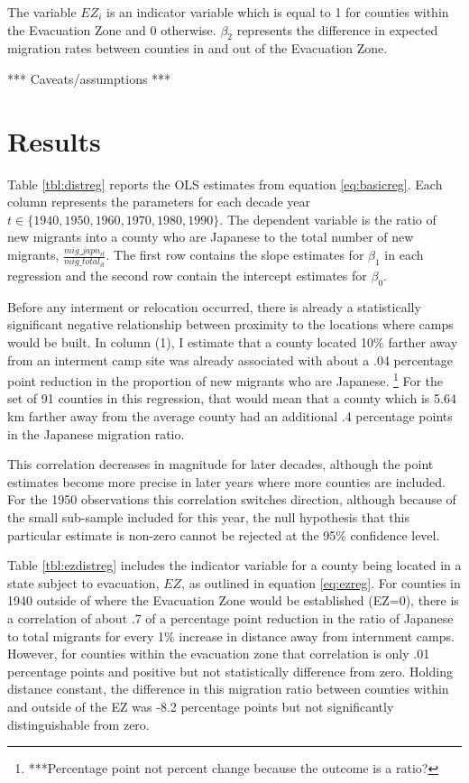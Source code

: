 \documentclass[12pt]{article}
\begin{document}
The variable $EZ_i$ is an indicator variable which is equal to 1 for counties within the Evacuation Zone and 0 otherwise.
$\beta_2$ represents the difference in expected migration rates between counties in and out of the Evacuation Zone.

*** Caveats/assumptions ***

\section{Results}\label{results}



Table \ref{tbl:distreg} reports the OLS estimates from equation \ref{eq:basicreg}.
Each column represents the parameters for each decade year $t \in \{1940, 1950, 1960, 1970, 1980, 1990\}$.
The dependent variable is the ratio of new migrants into a county who are Japanese to the total number of new migrants, $\frac{mig\_japn_{it}}{mig\_total_{it}}$.
The first row contains the slope estimates for $\beta_1$ in each regression
and the second row contain the intercept estimates for $\beta_0$.

Before any interment or relocation occurred, there is already a statistically significant negative relationship between proximity to the locations where camps would be built.
In column (1), I estimate that a county located 10\% farther away from an interment camp site was already associated with about a .04 percentage point reduction in the proportion of new migrants who are Japanese.
\footnote{***Percentage point not percent change because the outcome is a ratio?}
For the set of 91 counties in this regression, that would mean that a county which is 5.64 km farther away from the average county had an additional .4 percentage points in the Japanese migration ratio.

This correlation decreases in magnitude for later decades, although the point estimates become more precise in later years where more counties are included.
For the 1950 observations this correlation switches direction, although because of the small sub-sample included for this year, the null hypothesis that this particular estimate is non-zero cannot be rejected at the 95\% confidence level.



Table \ref{tbl:ezdistreg} includes the indicator variable for a county being located in a state subject to evacuation, $EZ$, as outlined in equation \ref{eq:ezreg}.
For counties in 1940 outside of where the Evacuation Zone would be established (EZ=0), there is a correlation of about .7 of a percentage point reduction in the ratio of Japanese to total migrants for every 1\% increase in distance away from internment camps.
However, for counties within the evacuation zone that correlation is only .01 percentage points and positive but not statistically difference from zero.
Holding distance constant, the difference in this migration ratio between counties within and outside of the EZ was -8.2 percentage points but not significantly distinguishable from zero.
\end{document}
